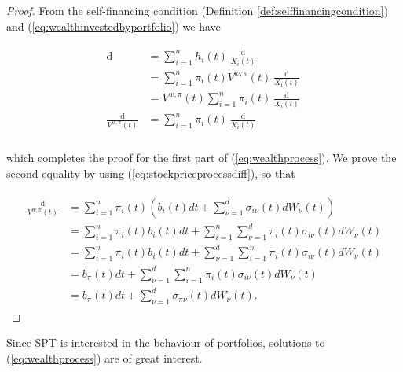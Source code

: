 \documentclass[british]{amsart} \usepackage{lmodern}
\numberwithin{equation}{section} \numberwithin{figure}{section}
\theoremstyle{plain} \newtheorem{thm}{\protect\theoremname}[section]
\theoremstyle{definition} \newtheorem{defn}[thm]{\protect\definitionname}
\theoremstyle{plain} \newtheorem{assumption}[thm]{\protect\assumptionname}
\theoremstyle{plain} \newtheorem{lem}[thm]{\protect\lemmaname}
\theoremstyle{plain} \newtheorem{prop}[thm]{\protect\propositionname}
\theoremstyle{remark} \newtheorem{rem}[thm]{\protect\remarkname}
\theoremstyle{plain} \newtheorem{cor}[thm]{\protect\corollaryname}
\renewcommand{\d}[1]{\mathop{\mathrm{d}{#1}}}
\begin{document}
\begin{proof}

  From the self-financing condition (Definition \ref{def:selffinancingcondition}) 
  and (\ref{eq:wealthinvestedbyportfolio}) we have

  \begin{gather*}
    \begin{split}
      \d{V^{w,\pi}(t)} 
      &= \sum_{i=1}^{n} h_{i}(t) \frac{\d{X_{i}(t)}}{X_{i}(t)} \\
      &= \sum_{i=1}^{n} \pi_{i}(t)V^{w,\pi}(t) \frac{\d{X_{i}(t)}}{X_{i}(t)} \\
      &= V^{w,\pi}(t) \sum_{i=1}^{n} \pi_{i}(t) \frac{\d{X_{i}(t)}}{X_{i}(t)} \\
      \frac{\d{V^{w,\pi}(t)}}{V^{w,\pi}(t)} 
      &= \sum_{i=1}^{n} \pi_{i}(t) \frac{\d{X_{i}(t)}}{X_{i}(t)} \\
    \end{split}
  \end{gather*}

  which completes the proof for the first part of (\ref{eq:wealthprocess}). We
  prove the second equality by using (\ref{eq:stockpriceprocessdiff}), so that

  \begin{gather*}
    \begin{split}
      \frac{\d{V^{w,\pi}(t)}}{V^{w,\pi}(t)}
          & = \sum_{i=1}^{n} \pi_{i}(t) 
          \left(
            b_{i}(t)dt + \sum_{\nu=1}^{d} \sigma_{i\nu}(t) dW_{\nu}(t)
          \right) \\
          & = \sum_{i=1}^{n} \pi_{i}(t) b_{i}(t)dt + 
              \sum_{i=1}^{n} \sum_{\nu=1}^{d} \pi_{i}(t) \sigma_{i\nu}(t) dW_{\nu}(t) \\
          & = \sum_{i=1}^{n} \pi_{i}(t) b_{i}(t)dt + 
              \sum_{\nu=1}^{d} \sum_{i=1}^{n} \pi_{i}(t) \sigma_{i\nu}(t) dW_{\nu}(t) \\
          & = b_{\pi}(t)dt + 
              \sum_{\nu=1}^{d} \sum_{i=1}^{n} \pi_{i}(t) \sigma_{i\nu}(t) dW_{\nu}(t) \\
          & = b_{\pi}(t)dt + 
              \sum_{\nu=1}^{d} \sigma_{\pi\nu}(t) dW_{\nu}(t).
    \end{split}
  \end{gather*}

\end{proof}

Since SPT is interested in the behaviour of portfolios, solutions to
(\ref{eq:wealthprocess}) are of great interest.
\end{document}
